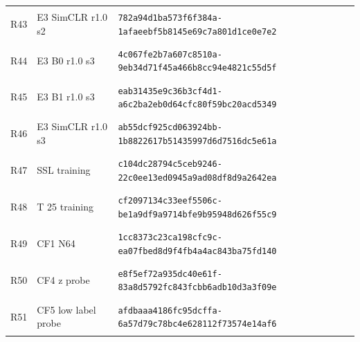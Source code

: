 \begin{longtable}{@{}l>{\raggedright\arraybackslash}p{3.5cm}p{10.8cm}@{}}
\hypertarget{R43}{R43} & E3 SimCLR r1.0 s2 & {\fontsize{8.8}{11}\selectfont\texttt{782a94d1ba573f6f384a-1afaeebf5b8145e69c7a801d1ce0e7e2}} \\
\hypertarget{R44}{R44} & E3 B0 r1.0 s3 & {\fontsize{8.8}{11}\selectfont\texttt{4c067fe2b7a607c8510a-9eb34d71f45a466b8cc94e4821c55d5f}} \\
\hypertarget{R45}{R45} & E3 B1 r1.0 s3 & {\fontsize{8.8}{11}\selectfont\texttt{eab31435e9c36b3cf4d1-a6c2ba2eb0d64cfc80f59bc20acd5349}} \\
\hypertarget{R46}{R46} & E3 SimCLR r1.0 s3 & {\fontsize{8.8}{11}\selectfont\texttt{ab55dcf925cd063924bb-1b8822617b51435997d6d7516dc5e61a}} \\
\hypertarget{R47}{R47} & SSL training & {\fontsize{8.8}{11}\selectfont\texttt{c104dc28794c5ceb9246-22c0ee13ed0945a9ad08df8d9a2642ea}} \\
\hypertarget{R48}{R48} & T 25 training & {\fontsize{8.8}{11}\selectfont\texttt{cf2097134c33eef5506c-be1a9df9a9714bfe9b95948d626f55c9}} \\
\hypertarget{R49}{R49} & CF1 N64 & {\fontsize{8.8}{11}\selectfont\texttt{1cc8373c23ca198cfc9c-ea07fbed8d9f4fb4a4ac843ba75fd140}} \\
\hypertarget{R50}{R50} & CF4 z probe & {\fontsize{8.8}{11}\selectfont\texttt{e8f5ef72a935dc40e61f-83a8d5792fc843fcbb6adb10d3a3f09e}} \\
\hypertarget{R51}{R51} & CF5 low label probe & {\fontsize{8.8}{11}\selectfont\texttt{afdbaaa4186fc95dcffa-6a57d79c78bc4e628112f73574e14af6}} \\
\bottomrule\end{longtable}\endgroup
